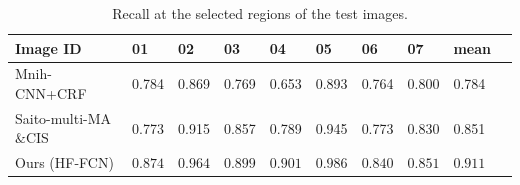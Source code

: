 	\begin{table} 
    \centering
	\caption{Recall at the selected regions of the test images.}
	\begin{tabular}{L{38mm}*{9}{C{9mm}}}     
	\toprule
	Image ID & 01 & 02 & 03 &04 &05 & 06 &07 & mean\\
	\midrule
	Mnih-CNN+CRF~\cite{Mnih2013Machine} & 0.784 & 0.869 & 0.769 & 0.653 & 0.893 & 0.764 & 0.800 & 0.784\\
	Saito-multi-MA$\&$CIS~\cite{Saito2016Multiple} & 0.773 & 0.915 & 0.857 & 0.789 & 0.945 & 0.773 &0.830 & 0.851\\
	Ours (HF-FCN) & $\bm{0.874}$ & $\bm{0.964}$  & $\bm{0.899}$ & $\bm{0.901}$ & $\bm{0.986}$ & $\bm{0.840}$ &  $\bm{0.851}$ & $\bm{0.911}$\\
	\bottomrule
	\end{tabular}
	\label{tab:ComparedResultsRecall}
	\end{table} 
 	 

